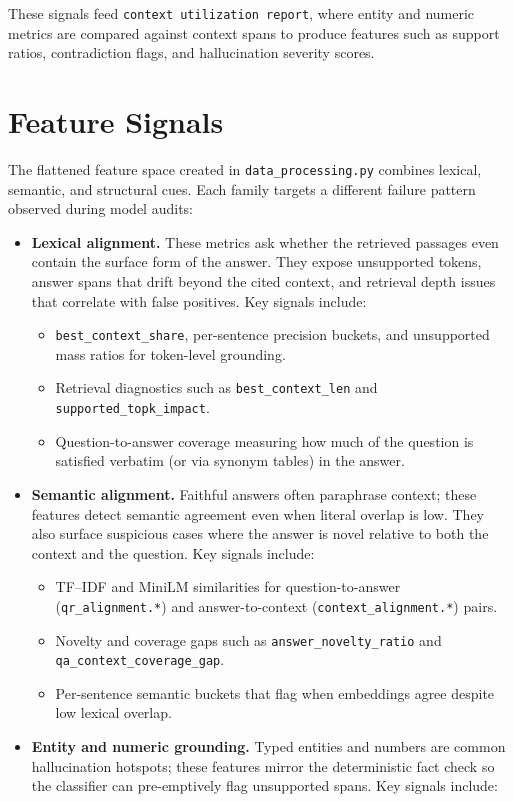 \documentclass[11pt]{article}
\begin{document}
These signals feed \texttt{context utilization report}, where entity and numeric metrics are compared against context spans to produce features such as support ratios, contradiction flags, and hallucination severity scores.

\section{Feature Signals}
The flattened feature space created in \texttt{data\_processing.py} combines lexical, semantic, and structural cues. Each family targets a different failure pattern observed during model audits:
\begin{itemize}
  \item \textbf{Lexical alignment.} These metrics ask whether the retrieved passages even contain the surface form of the answer. They expose unsupported tokens, answer spans that drift beyond the cited context, and retrieval depth issues that correlate with false positives. Key signals include:
    \begin{itemize}
      \item \texttt{best\_context\_share}, per-sentence precision buckets, and unsupported mass ratios for token-level grounding.
      \item Retrieval diagnostics such as \texttt{best\_context\_len} and \texttt{supported\_topk\_impact}.
      \item Question-to-answer coverage measuring how much of the question is satisfied verbatim (or via synonym tables) in the answer.
    \end{itemize}
  \item \textbf{Semantic alignment.} Faithful answers often paraphrase context; these features detect semantic agreement even when literal overlap is low. They also surface suspicious cases where the answer is novel relative to both the context and the question. Key signals include:
    \begin{itemize}
      \item TF--IDF and MiniLM similarities for question-to-answer (\texttt{qr\_alignment.*}) and answer-to-context (\texttt{context\_alignment.*}) pairs.
      \item Novelty and coverage gaps such as \texttt{answer\_novelty\_ratio} and \texttt{qa\_context\_coverage\_gap}.
      \item Per-sentence semantic buckets that flag when embeddings agree despite low lexical overlap.
    \end{itemize}
  \item \textbf{Entity and numeric grounding.} Typed entities and numbers are common hallucination hotspots; these features mirror the deterministic fact check so the classifier can pre-emptively flag unsupported spans. Key signals include:

\end{itemize}
\end{document}
